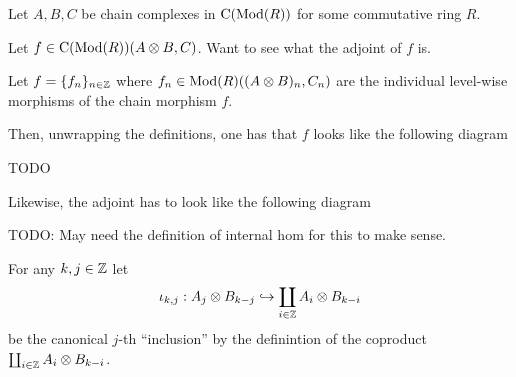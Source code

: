     

\begin{remark}
    Let \( A, B, C \) be chain complexes in \( \operatorname{C}(\operatorname{Mod}(R)) \) for some commutative ring \( R \).

    Let  \( f \in \operatorname{C}(\operatorname{Mod}(R))(A \otimes B, C) \). Want to see what the adjoint of \( f \) is.

    Let \( f = \{f_n\}_{n \in {\mathbb{Z}}} \) where \( f_n \in \operatorname{Mod}(R)( (A \otimes B)_n, C_n) \) are the individual level-wise morphisms of the chain morphism \( f \).

    Then, unwrapping the definitions, one has that \( f \) looks like the following diagram
    \begin{center}
        TODO
    \end{center}
    Likewise, the adjoint has to look like the following diagram
    \begin{center}
        TODO: May need the definition of internal hom for this to make sense.
    \end{center}

    For any \( k, j \in {\mathbb{Z}} \) let
    \[
        \iota_{k, j}: A_j \otimes B_{k - j} \hookrightarrow \coprod_{i \in {\mathbb{Z}}} A_i \otimes B_{k - i}
    \]
    be the canonical \( j \)-th ``inclusion'' by the definintion of the coproduct \( \coprod_{i \in {\mathbb{Z}}} A_i \otimes B_{k - i} \).



\end{remark}
